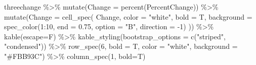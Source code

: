 \documentclass[
]{book}
\newenvironment{Shaded}{\begin{snugshade}}{\end{snugshade}}
\newcommand{\AttributeTok}[1]{\textcolor[rgb]{0.77,0.63,0.00}{#1}}
\newcommand{\DecValTok}[1]{\textcolor[rgb]{0.00,0.00,0.81}{#1}}
\newcommand{\FloatTok}[1]{\textcolor[rgb]{0.00,0.00,0.81}{#1}}
\newcommand{\FunctionTok}[1]{\textcolor[rgb]{0.00,0.00,0.00}{#1}}
\newcommand{\NormalTok}[1]{#1}
\newcommand{\SpecialCharTok}[1]{\textcolor[rgb]{0.00,0.00,0.00}{#1}}
\newcommand{\StringTok}[1]{\textcolor[rgb]{0.31,0.60,0.02}{#1}}
\begin{document}
\begin{Shaded}
\begin{Highlighting}[]
\NormalTok{threechange }\SpecialCharTok{\%\textgreater{}\%} 
  \FunctionTok{mutate}\NormalTok{(}\AttributeTok{Change =} \FunctionTok{percent}\NormalTok{(PercentChange)) }\SpecialCharTok{\%\textgreater{}\%}
  \FunctionTok{mutate}\NormalTok{(}\AttributeTok{Change =} \FunctionTok{cell\_spec}\NormalTok{(}
\NormalTok{    Change, }\AttributeTok{color =} \StringTok{"white"}\NormalTok{, }\AttributeTok{bold =}\NormalTok{ T,}
    \AttributeTok{background =} \FunctionTok{spec\_color}\NormalTok{(}\DecValTok{1}\SpecialCharTok{:}\DecValTok{10}\NormalTok{, }\AttributeTok{end =} \FloatTok{0.75}\NormalTok{, }\AttributeTok{option =} \StringTok{"B"}\NormalTok{, }\AttributeTok{direction =} \SpecialCharTok{{-}}\DecValTok{1}\NormalTok{)}
\NormalTok{  )) }\SpecialCharTok{\%\textgreater{}\%}
  \FunctionTok{kable}\NormalTok{(}\AttributeTok{escape=}\NormalTok{F) }\SpecialCharTok{\%\textgreater{}\%} 
  \FunctionTok{kable\_styling}\NormalTok{(}\AttributeTok{bootstrap\_options =} \FunctionTok{c}\NormalTok{(}\StringTok{"striped"}\NormalTok{, }\StringTok{"condensed"}\NormalTok{)) }\SpecialCharTok{\%\textgreater{}\%}
  \FunctionTok{row\_spec}\NormalTok{(}\DecValTok{6}\NormalTok{, }\AttributeTok{bold =}\NormalTok{ T, }\AttributeTok{color =} \StringTok{"white"}\NormalTok{, }\AttributeTok{background =} \StringTok{"\#FBB93C"}\NormalTok{) }\SpecialCharTok{\%\textgreater{}\%}
  \FunctionTok{column\_spec}\NormalTok{(}\DecValTok{1}\NormalTok{, }\AttributeTok{bold=}\NormalTok{T)}
\end{Highlighting}
\end{Shaded}
\end{document}
